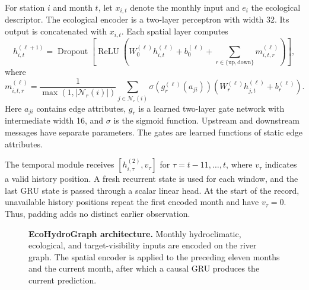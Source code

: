 \documentclass[11pt]{article}
\begin{document}
For station $i$ and month $t$, let $x_{i,t}$ denote the monthly input and $e_i$ the ecological descriptor. The ecological encoder is a two-layer perceptron with width 32. Its output is concatenated with $x_{i,t}$. Each spatial layer computes
\begin{equation}
 h^{(\ell+1)}_{i,t}=\operatorname{Dropout}\!\left[\operatorname{ReLU}\!\left(
 W_0^{(\ell)}h^{(\ell)}_{i,t}+b_0^{(\ell)}+
 \sum_{r\in\{\mathrm{up},\mathrm{down}\}}m^{(\ell)}_{i,t,r}\right)\right],
\end{equation}
where
\begin{equation}
 m^{(\ell)}_{i,t,r}=\frac{1}{\max(1,|\mathcal N_r(i)|)}
 \sum_{j\in\mathcal N_r(i)}\sigma(g_r^{(\ell)}(a_{ji}))
 \left(W_r^{(\ell)}h^{(\ell)}_{j,t}+b_r^{(\ell)}\right).
\end{equation}
Here $a_{ji}$ contains edge attributes, $g_r$ is a learned two-layer gate network with intermediate width 16, and $\sigma$ is the sigmoid function. Upstream and downstream messages have separate parameters. The gates are learned functions of static edge attributes.

The temporal module receives $[h_{i,\tau}^{(2)},v_\tau]$ for $\tau=t-11,\ldots,t$, where $v_\tau$ indicates a valid history position. A fresh recurrent state is used for each window, and the last GRU state is passed through a scalar linear head. At the start of the record, unavailable history positions repeat the first encoded month and have $v_\tau=0$. Thus, padding adds no distinct earlier observation.

\begin{figure}[t]\centering
\resizebox{\linewidth}{!}{}
\caption{\textbf{EcoHydroGraph architecture.} Monthly hydroclimatic, ecological, and target-visibility inputs are encoded on the river graph. The spatial encoder is applied to the preceding eleven months and the current month, after which a causal GRU produces the current prediction.}
\label{fig:architecture}
\end{figure}
\end{document}

